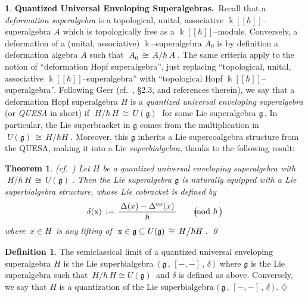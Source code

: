 \documentclass[12pt,reqno,twoside,a4paper]{amsart}
\numberwithin{equation}{section}
\newtheorem{theorem}[lema]{Theorem}
\theoremstyle{definition}
\newtheorem{definition}[lema]{Definition}
\newtheorem{free text}[lema]{}
\theoremstyle{remark}
\newcommand \op{\operatorname{op}}
\def \kh{{\Bbbk[[\hbar]]}}
\def \lieg{\mathfrak{g}}
\theoremstyle{plain}
\begin{document}
\begin{free text}  \label{QUESA's}
%
 {\bf Quantized Universal Enveloping Superalgebras.}\,
%
 Recall that a  \textit{deformation superalgebra\/}  is a topological, unital, associative
 $ \kh $--superalgebra  $ A $  which is topologically free as a  $ \kh $--module.
 Conversely, a deformation of a (unital, associative)  $ \Bbbk $--superalgebra  $ A_0 $  is
 by definition a deformation algebra  $ A $  such that
 $ \; A_0 \, \cong \, A \big/ \hbar \, A \; $.  The same criteria apply to the notion of
 ``deformation Hopf superalgebra'', just replacing ``topological, unital, associative
 $ \kh $--superalgebra''  with ``topological Hopf  $ \kh $--superalgebra''.
 Following Geer  (cf.\ \cite{Ge1},  \S 2.3, and references therein),
 we say that a deformation Hopf superalgebra  $ H $  is a
 \textit{quantized universal enveloping superalgebra\/}  (or  \textsl{QUESA\/}  in short) if
 $ \; H \big/ \hbar \, H \, \cong \, U(\lieg) \; $  for some Lie superalgebra  $ \lieg \, $.
 In particular, the Lie superbracket in  $ \lieg $  comes from the multiplication in
 $ \; U(\lieg) \, \cong \, H \big/ \hbar H \; $.
   Moreover, this  $ \lieg $  inherits a Lie supercoalgebra structure from the QUESA,
   making it into a Lie \textsl{superbialgebra},  thanks to the following result:
%
\end{free text}

\vskip9pt

\begin{theorem}  (cf.\ \cite[\S 2.3]{Ge1})  \label{thm:Lie-coalgebra-limit}
%
 Let  $ H $  be a quantized universal enveloping superalgebra with
 $ \; H \big/ \hbar \, H \, \cong \, U(\lieg) \; $.
 Then the Lie superalgebra  $ \lieg $  is naturally equipped with a
 Lie superbialgebra structure, whose Lie cobracket is defined by
%
\begin{equation}  \label{def: cocorchete-semiclasico}
%
 \delta(\text{\rm x})  \, := \,  \frac{\,\Delta(x) - \Delta^{\op}(x)\,}{\,\hbar\,}   \qquad  \big(\hskip-10pt \mod \hbar \,\big)
%
\end{equation}
%
where  $ \, x \in H \, $  is any lifting of  $ \; \text{\rm x} \in \lieg \subseteq U(\lieg) \, \cong \, H \big/ \hbar H \, $.   \qed
%
\end{theorem}

\vskip11pt

\begin{definition}  \cite{CP,Ge1}
%
 The semiclassical limit of a quantized universal enveloping superalgebra
 $ H $ is the Lie superbialgebra  $ \, \big(\, \lieg \, , \, [-,-] \, , \, \delta \,\big) \, $
 where  $ \lieg $  is the Lie superalgebra such that
 $ \, H \big/ \hbar \, H \cong U(\lieg) \, $  and  $ \delta $  is defined as above.
 Conversely, we say that  $ H $  is a quantization of the Lie superbialgebra
 $ \big(\, \lieg \, , \, [-,-] \, , \, \delta \,\big) \, $.   \hfill  $ \diamondsuit $
%
\end{definition}
\end{document}
